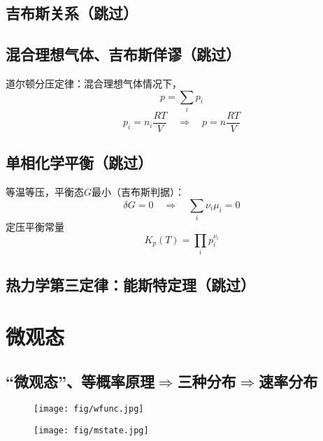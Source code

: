 \documentclass[UTF8,12pt]{ctexart}
\begin{document}
\subsection{吉布斯关系（跳过）}

\subsection{混合理想气体、吉布斯佯谬（跳过）}

道尔顿分压定律：混合理想气体情况下，
$$p=\sum_i p_i$$
$$p_i=n_i\frac{RT}{V}\quad\Longrightarrow\quad p=n\frac{RT}{V}$$

\subsection{单相化学平衡（跳过）}

等温等压，平衡态$G$最小（吉布斯判据）：
$$\delta G=0\quad\Longrightarrow\quad \sum_i\nu_i\mu_i=0$$
定压平衡常量
$$K_p(T)=\prod_ip_i^{\nu_i}$$

\subsection{热力学第三定律：能斯特定理（跳过）}

\newpage
\section{微观态}

\subsection{“微观态”、等概率原理$\Longrightarrow$三种分布$\Longrightarrow$速率分布}

\begin{figure}[H]
    {
    \begin{minipage}{8.16cm}
    \centering
    \texttt{[image: fig/wfunc.jpg]}
    \end{minipage}\label{}
    }
    {
    \begin{minipage}{8.16cm}
    \centering
    \texttt{[image: fig/mstate.jpg]}
    \end{minipage}\label{}
    }
\end{figure}
\end{document}

